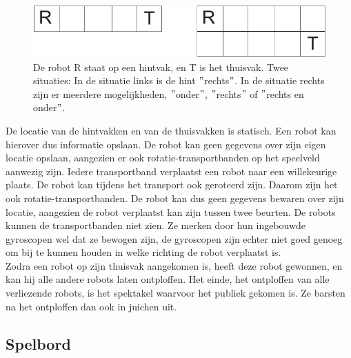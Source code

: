 \begin{figure}
\includegraphics{informal/plaatjes.pdf}
\caption{De robot R staat op een hintvak, en T is het thuisvak. Twee situaties: In de situatie links is de hint $"$rechts$"$. In de situatie rechts zijn er meerdere mogelijkheden, $"$onder$"$, $"$rechts$"$ of $"$rechts en onder$"$.}
\label{hintvakken}
\end{figure}

De locatie van de hintvakken en van de thuisvakken is statisch. Een robot kan hierover dus informatie opslaan. De robot kan geen gegevens over zijn eigen locatie opslaan, aangezien er ook rotatie-transportbanden op het speelveld aanwezig zijn. Iedere transportband verplaatst een robot naar een willekeurige plaats. De robot kan tijdens het transport ook geroteerd zijn. Daarom zijn het ook rotatie-transportbanden. De robot kan dus geen gegevens bewaren over zijn locatie, aangezien de robot verplaatst kan zijn tussen twee beurten. De robots kunnen de transportbanden niet zien. Ze merken door hun ingebouwde gyroscopen wel dat ze bewogen zijn, de gyroscopen zijn echter niet goed genoeg om bij te kunnen houden in welke richting de robot verplaatst is.\\
Zodra een robot op zijn thuisvak aangekomen is, heeft deze robot gewonnen, en kan hij alle andere robots laten ontploffen. Het einde, het ontploffen van alle verliezende robots, is het spektakel waarvoor het publiek gekomen is. Ze barsten na het ontploffen dan ook in juichen uit.

\subsection{Spelbord}

